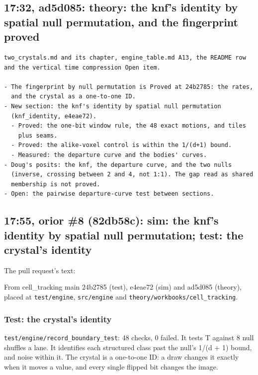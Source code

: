 \subsection{\texorpdfstring{17:32, ad5d085: theory: the knf's identity by spatial null permutation, and the fingerprint proved}{17:32, ad5d085: theory: the knf's identity by spatial null permutation, and the fingerprint proved}}

\begin{Verbatim}
two_crystals.md and its chapter, engine_table.md A13, the README row
and the vertical time compression Open item.

- The fingerprint by null permutation is Proved at 24b2785: the rates,
  and the crystal as a one-to-one ID.
- New section: the knf's identity by spatial null permutation
  (knf_identity, e4eae72).
  - Proved: the one-bit window rule, the 48 exact motions, and tiles
    plus seams.
  - Proved: the alike-voxel control is within the 1/(d+1) bound.
  - Measured: the departure curve and the bodies' curves.
- Doug's posits: the knf, the departure curve, and the two nulls
  (inverse, crossing between 2 and 4, not 1:1). The gap read as shared
  membership is not proved.
- Open: the pairwise departure-curve test between sections.
\end{Verbatim}

\subsection{\texorpdfstring{17:55, orior \#8 (82db58c): sim: the knf's identity by spatial null permutation; test: the crystal's identity}{17:55, orior \#8 (82db58c): sim: the knf's identity by spatial null permutation; test: the crystal's identity}}

The pull request's text:

From cell\_\allowbreak{}tracking main 24b2785 (test), e4eae72 (sim) and ad5d085 (theory), placed at \texttt{test/\allowbreak{}engine}, \texttt{src/\allowbreak{}engine} and \texttt{theory/\allowbreak{}workbooks/\allowbreak{}cell\_\allowbreak{}tracking}.

\subsubsection{\texorpdfstring{Test: the crystal's identity}{Test: the crystal's identity}}

\texttt{test/\allowbreak{}engine/\allowbreak{}record\_\allowbreak{}boundary\_\allowbreak{}test}: 48 checks, 0 failed. It tests T against 8 null shuffles a lane. It identifies each structured class past the null's 1/(d + 1) bound, and noise within it. The crystal is a one-to-one ID: a draw changes it exactly when it moves a value, and every single flipped bit changes the image.

